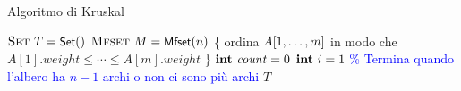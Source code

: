 \begin{frame}{Algoritmo di Kruskal}
	
\vspace{-12pt}
\begin{Procedure}
\caption[A]{\Set\ \kruskal($\textsc{edge}[\,]\ A,\ \INTEGER\ n,\ \INTEGER\ m$)}

$\textsc{Set}\ T = \textsf{{\small Set}}()$\;
$\textsc{Mfset}\ M = \textsf{{\small Mfset}}(n)$\;
\{ ordina $A[1, \ldots, m]$ in modo che $A[1].\mathit{weight} \le \cdots \le A[m].\mathit{weight}$ \}\;
$\INTEGER\ \mathit{count} = 0$\;
$\INTEGER\ i = 1$\;
\textcolor{blue}{\% Termina quando l'albero ha $n-1$ archi o non ci sono più archi}\;
\Return $T$\;
\end{Procedure}

\end{frame}

